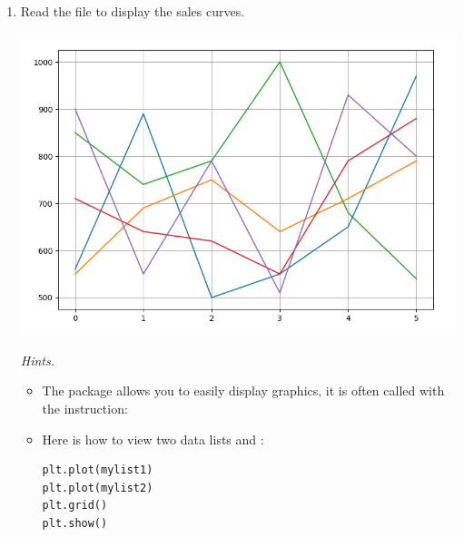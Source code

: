 \documentclass[11pt,class=report,crop=false]{standalone}
\begin{document}
\begin{activite}
\begin{enumerate}
  \item Read the file  to display the sales curves.
  \begin{center}
\includegraphics[scale=\myscale,scale=0.4]{screen-files-2c-en}
\end{center}  

  \emph{Hints.} 
  \begin{itemize}
    	\item The  package allows you to easily display graphics, it is often called with the instruction:  	
   
   \item Here is how to view two data lists  and :
\begin{center}
\begin{minipage}{0.4\textwidth}
\begin{lstlisting}
plt.plot(mylist1)
plt.plot(mylist2)
plt.grid()
plt.show()
\end{lstlisting}
\end{minipage}
\end{center}


   \end{itemize}
\end{enumerate}   
     
\end{activite}

\end{document}
